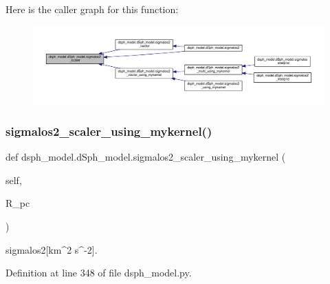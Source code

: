 Here is the caller graph for this function\+:\nopagebreak
\begin{figure}[H]
\begin{center}
\leavevmode
\includegraphics[width=350pt]{d0/d25/classdsph__model_1_1dSph__model_a05b988f7553121226a4d08369c44b4fa_icgraph}
\end{center}
\end{figure}
\mbox{\label{classdsph__model_1_1dSph__model_a14692f81c0bffc790d5daf7f4e6464c1}} 
\subsubsection{\texorpdfstring{sigmalos2\+\_\+scaler\+\_\+using\+\_\+mykernel()}{sigmalos2\_scaler\_using\_mykernel()}}
{\footnotesize\ttfamily def dsph\+\_\+model.\+d\+Sph\+\_\+model.\+sigmalos2\+\_\+scaler\+\_\+using\+\_\+mykernel (\begin{DoxyParamCaption}\item[{}]{self,  }\item[{}]{R\+\_\+pc }\end{DoxyParamCaption})}

\begin{DoxyVerb}sigmalos2[km^2 s^-2].
\end{DoxyVerb}
 

Definition at line 348 of file dsph\+\_\+model.\+py.


